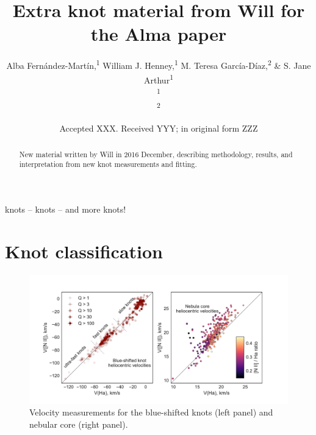 \documentclass[usenatbib]{mnras}
\title[Will's extra material]{Extra knot material from Will for the
  Alma paper}
\author[Fernández-Martín et al.]{
  Alba Fernández-Martín,\textsuperscript{1}
  William J. Henney,\textsuperscript{1}
  M. Teresa García-Díaz,\textsuperscript{2}
  \& S. Jane Arthur\textsuperscript{1}\\
  \textsuperscript{1}\AddressIRyA\\
  \textsuperscript{2}\AddressEnsenada\\
}
\date{Accepted XXX. Received YYY; in original form ZZZ}
\begin{document}
\label{firstpage}
\pagerange{\pageref{firstpage}--\pageref{lastpage}}
\maketitle

\begin{abstract}
New material written by Will in 2016 December, describing methodology,
results, and interpretation from new knot measurements and fitting.
\end{abstract}

\begin{keywords}
knots -- knots -- and more knots!
\end{keywords}

\newcommand\nii{\ensuremath{\ion{N}{ii}}}
\newcommand\ha{\ensuremath{\mathrm{H\alpha}}}

\section{Knot classification}
\label{sec:knot-classification}

\begin{figure}
  \centering
  \includegraphics[width=\linewidth]{knot-and-core-velocities-ha-nii}
  \caption{Velocity measurements for the blue-shifted knots (left
    panel) and nebular core (right panel).}
  \label{fig:velocity-ha-nii}
\end{figure}
\end{document}
